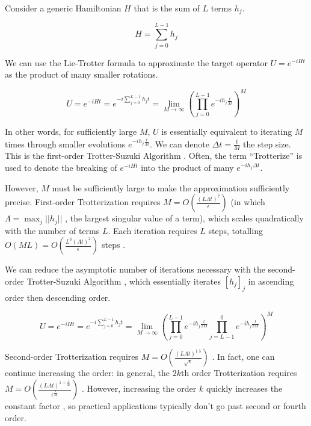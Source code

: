 Consider a generic Hamiltonian $H$ that is the sum of $L$ terms $h_j$.

\begin{equation}
    H = \sum_{j = 0}^{L - 1} h_j
\end{equation}

We can use the Lie-Trotter formula \cite{QCC} to approximate the target operator $U = e^{-iHt}$ as the product of many smaller rotations.

\begin{equation}
    U = e^{-iHt} = e^{-i\sum_{j = 0}^{L - 1} h_jt} = \lim_{M \rightarrow \infty} (\prod_{j = 0}^{L - 1} e^{-ih_j\frac{t}{M}})^M
\end{equation}

In other words, for sufficiently large $M$, $U$ is essentially equivalent to iterating $M$ times through smaller evolutions $e^{-ih_j\frac{t}{M}}$. We can denote $\Delta t = \frac{t}{M}$ the step size. This is the first-order Trotter-Suzuki Algorithm \cite{Amortize4}. Often, the term ``Trotterize'' \cite{QCC} is used to denote the breaking of $e^{-iHt}$ into the product of many $e^{-ih_j\Delta t}$.

However, $M$ must be sufficiently large to make the approximation sufficiently precise. First-order Trotterization requires $M = O(\frac{(L\Lambda t)^2}{\epsilon})$ (in which $\Lambda = \max_j ||h_j||$ \cite{QDRIFT}, the largest singular value of a term), which scales quadratically with the number of terms $L$. Each iteration requires $L$ steps, totalling $O(ML) = O(\frac{L^3(\Lambda t)^2}{\epsilon})$ steps \cite{QDRIFT}.

We can reduce the asymptotic number of iterations necessary with the second-order Trotter-Suzuki Algorithm \cite{Amortize4}, which essentially iterates $[h_j]_j$ in ascending order then descending order.

\begin{equation}
    U = e^{-iHt} = e^{-i\sum_{j = 0}^{L - 1} h_jt} = \lim_{M \rightarrow \infty} (\prod_{j = 0}^{L - 1} e^{-ih_j\frac{t}{2M}}\prod_{j = L - 1}^{0} e^{-ih_j\frac{t}{2M}})^M
\end{equation}

Second-order Trotterization requires $M = O(\frac{(L\Lambda t)^{1.5}}{\sqrt{\epsilon}})$ \cite{QDRIFT}. In fact, one can continue increasing the order: in general, the $2k$th order Trotterization requires $M = O(\frac{(L\Lambda t)^{1+\frac{1}{2k}}}{\epsilon^{\frac{1}{2k}}})$ \cite{QDRIFT}. However, increasing the order $k$ quickly increases the constant factor \cite{QDRIFT}, so practical applications typically don't go past second or fourth order.

